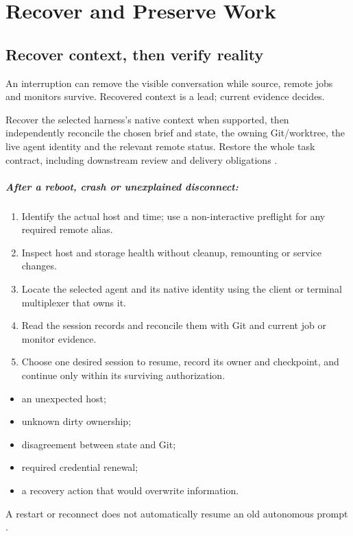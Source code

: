 \chapter{Recover and Preserve Work}\label{ch:recovery}
\section{Recover context, then verify reality}

\begin{headline}
  An interruption can remove the visible conversation while source, remote jobs and
  monitors survive. Recovered context is a lead; current evidence decides.
\end{headline}

Recover the selected harness's native context when supported, then independently
reconcile the chosen brief and state, the owning Git/worktree, the live agent identity
and the relevant remote status. Restore the whole task contract, including downstream
review and delivery obligations \cite[Recover harness context, then verify
  it]{skill:recovery}.

\paragraph{After a reboot, crash or unexplained disconnect:}
\begin{enumerate}
  \item Identify the actual host and time; use a non-interactive preflight for any required
        remote alias.
  \item Inspect host and storage health without cleanup, remounting or service changes.
  \item Locate the selected agent and its native identity using the client or terminal
        multiplexer that owns it.
  \item Read the session records and reconcile them with Git and current job or monitor evidence.
  \item Choose one desired session to resume, record its owner and checkpoint, and continue only
        within its surviving authorization.
\end{enumerate}

\begin{rulebox}[Stop on]
  \begin{itemize}[leftmargin=1.2em]
    \item an unexpected host;
    \item unknown dirty ownership;
    \item disagreement between state and Git;
    \item required credential renewal;
    \item a recovery action that would overwrite information.
  \end{itemize}
  A restart or reconnect does not automatically resume an old autonomous prompt
  \cite[Startup and recovery, steps 1--8; Stop conditions]{skill:recovery}.
\end{rulebox}

